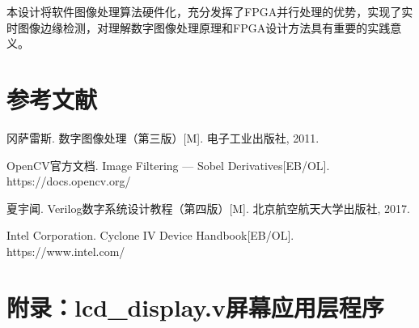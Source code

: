 \documentclass[12pt,hyperref,a4paper,UTF8]{ctexart}
\begin{document}
本设计将软件图像处理算法硬件化，充分发挥了FPGA并行处理的优势，实现了实时图像边缘检测，对理解数字图像处理原理和FPGA设计方法具有重要的实践意义。

\section{参考文献}

\begin{enumerate}[label={[\arabic*]}]
    \item 冈萨雷斯. 数字图像处理（第三版）[M]. 电子工业出版社, 2011.
    \item OpenCV官方文档. Image Filtering — Sobel Derivatives[EB/OL]. https://docs.opencv.org/
    \item 夏宇闻. Verilog数字系统设计教程（第四版）[M]. 北京航空航天大学出版社, 2017.
    \item Intel Corporation. Cyclone IV Device Handbook[EB/OL]. https://www.intel.com/
\end{enumerate}

\newpage
\section*{附录：lcd\_display.v屏幕应用层程序}
\end{document}
